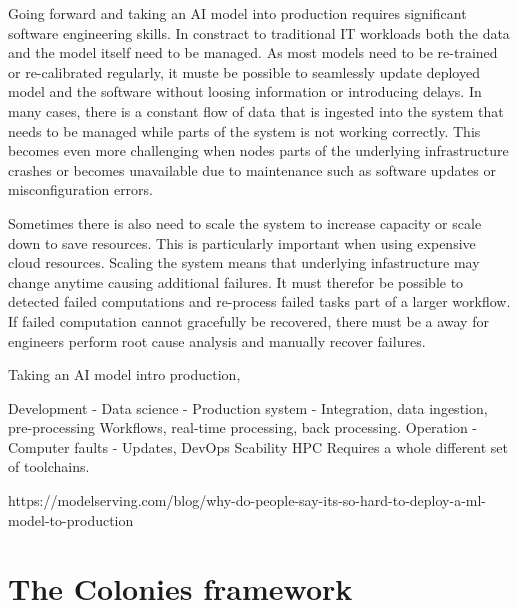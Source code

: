\documentclass{article}
\begin{document}
Going forward and taking an AI model into production requires significant software engineering skills. In constract to traditional IT workloads both the data and the model itself need to be managed. As most models need to be re-trained or re-calibrated regularly, it muste be possible to seamlessly update deployed model and the software without loosing information or introducing delays. In many cases, there is a constant flow of data that is ingested into the system that needs to be managed while parts of the system is not working correctly. This becomes even more challenging when nodes parts of the underlying infrastructure crashes or becomes unavailable due to maintenance such as software updates or misconfiguration errors. 

Sometimes there is also need to scale the system to increase capacity or scale down to save resources. This is particularly important when using expensive cloud resources. Scaling the system means that underlying infastructure may change anytime causing additional failures. It must therefor be possible to detected failed computations and re-process failed tasks part of a larger workflow. If failed computation cannot gracefully be recovered, there must be a away for engineers perform root cause analysis and manually recover failures. 










Taking an AI model intro production, 

Development
 - Data science
 - Production system
 - Integration, data ingestion, pre-processing
 Workflows, real-time processing, back processing.
Operation
 - Computer faults
 - Updates, DevOps
Scability
HPC
 Requires a whole different set of toolchains. 

 


https://modelserving.com/blog/why-do-people-say-its-so-hard-to-deploy-a-ml-model-to-production
\section{The Colonies framework}
\label{sec:headings}
\end{document}
